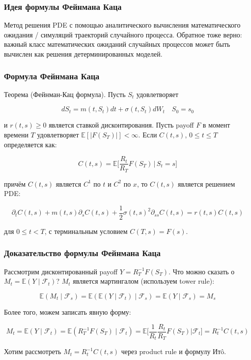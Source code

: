 \documentclass{beamer}
\begin{document}
\begin{frame}
\frametitle{Идея формулы Фейнмана Каца}

Метод решения PDE с помощью аналитического вычисления математического ожидания / симуляций траекторий случайного процесса. Обратное тоже верно: важный класс математических ожиданий случайных процессов может быть вычислен как решения детерминированных моделей.

\end{frame}

\begin{frame}
\frametitle{Формула Фейнмана Каца}

Теорема (Фейнман-Кац формула). Пусть \(S_t\) удовлетворяет

\[ dS_t = m(t, S_t) dt + \sigma(t, S_t) dW_t \quad S_0 = s_0 \]

и \(r(t, s) \geq 0\) является ставкой дисконтирования. Пусть payoff \(F\) в момент времени \(T\) удовлетворяет \(\mathbb{E}[|F(S_T)|] < \infty\). Если \(C(t, s)\), \(0 \le t \le T\) определяется как:

\[ C(t, s) = \mathbb{E}\bigg[\frac{R_t}{R_T} F(S_T)\, \bigg|\, S_t = s\bigg]\]

причём \(C(t, s)\) является \(C^1\) по \(t\) и \(C^2\) по \(x\), то \(C(t, s)\) является решением PDE:

\[ \partial_t C(t, s) + m(t, s) \partial_s C(t, s) + \frac{1}{2} \sigma(t, s)^2 \partial_{ss} C(t, s) = r(t, s) C(t, s) \]

для \(0 \le t < T\), с терминальным условием \(C(T, s) = F(s)\).

\end{frame}

\begin{frame}
\frametitle{Доказательство формулы Фейнмана Каца}

Рассмотрим дисконтированный payoff $Y = R_T^{-1} F(S_T)$. Что можно сказать о $M_t = \mathbb{E}(Y \mid \mathcal{F}_t)$? $M_t$ является мартингалом (используем tower rule):

\[
\mathbb{E}(M_t \mid \mathcal{F}_s) = \mathbb{E}(\mathbb{E}(Y \mid \mathcal{F}_t)\mid \mathcal{F}_s) = \mathbb{E}(Y \mid \mathcal{F}_s) = M_s
\]

Более того, можем записать явную форму:

\[
\!\!\!\!\!\!\!\!\!\!\! M_t = \mathbb{E}(Y \mid \mathcal{F}_t) = \mathbb{E}(R_T^{-1} F(S_T) \mid \mathcal{F}_t) = 
\mathbb{E}\bigg[ \frac{1}{R_t} \frac{R_t}{R_T} F(S_T) \bigg| \mathcal{F}_t\bigg] = R_t^{-1} C(t, s)
\]

Хотим рассмотреть $M_t = R_t^{-1} C(t, s)$ через product rule и формулу Итô.

\end{frame}
\end{document}
